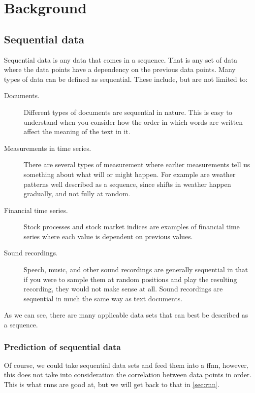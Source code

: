 \documentclass[12pt]{article}
\begin{document}
\section{Background}
\subsection{Sequential data}    \label{sec:seq-data}
Sequential data is any data that comes in a sequence. That is any set of data where the data points have a dependency on the previous data points. Many types of data can be defined as sequential. These include, but are not limited to: \cite{jamesDeepLearning2023}
\begin{description}
    \item[Documents.] Different types of documents are sequential in nature. This is easy to understand when you consider how the order in which words are written affect the meaning of the text in it.
    \item[Measurements in time series.] There are several types of measurement where earlier measurements tell us something about what will or might happen. For example are weather patterns well described as a sequence, since shifts in weather happen gradually, and not fully at random.
    \item[Financial time series.] Stock processes and stock market indices are examples of financial time series where each value is dependent on previous values.
    \item[Sound recordings.] Speech, music, and other sound recordings are generally sequential in that if you were to sample them at random positions and play the resulting recording, they would not make sense at all. Sound recordings are sequential in much the same way as text documents.
\end{description}

\noindent
As we can see, there are many applicable data sets that can best be described as a sequence.

\subsubsection{Prediction of sequential data}
Of course, we could take sequential data sets and feed them into a \gls{ffnn}, however, this does not take into consideration the correlation between data points in order. This is what \gls{rnn}s are good at, but we will get back to that in \cref{sec:rnn}.
\end{document}
